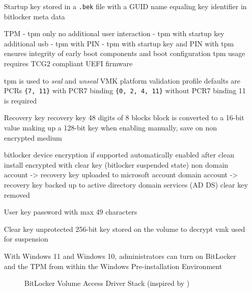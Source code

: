 \begin{itemize}
    \item[Startup key] stored in a \lstinline{.bek} file with a \ac{GUID} name equaling key identifier in bitlocker meta data
        \cite[2.6. Startup key]{bde-format-spec}
    \item[TPM]
        - tpm only
        no additional user interaction
        - tpm with startup key
        additional usb
        - tpm with PIN
        - tpm with startup key and PIN
        \cite{microsoft-bitlocker-countermeasures}
        with tpm ensures integrity of early boot components and boot configuration
        tpm usage requires \ac{TCG}2 compliant \ac{UEFI} firmware \cite[9. TPM]{windows-internals-6-part2}

        tpm is used to \emph{seal} and \emph{unseal} \ac{VMK}
        platform validation profile
        defaults are \acp{PCR} \lstinline|{7, 11}| with PCR7 binding  \lstinline|{0, 2, 4, 11}| without PCR7 binding
        11 is required
    \item[Recovery key] recovery key 48 digits of 8 blocks
        block is converted to a 16-bit value making up a 128-bit key
        \cite[2.4. Recovery key]{bde-format-spec}
        when enabling manually, save on non encrypted medium
        \cite{microsoft-bitlocker-basic-deployment}

        bitlocker device encryption if supported automatically enabled
        after clean install encrypted with clear key (bitlocker suspended state)
        non domain account -> recovery key uploaded to microsoft account
        domain account -> recovery key backed up to active directory domain services (AD DS)
        clear key removed
        \cite{microsoft-bitlocker-device-encryption}

    \item[User key] password with max 49 characters
        \cite[2.7. User key]{bde-format-spec}
    \item[Clear key] unprotected 256-bit key stored on the volume to decrypt vmk
        \cite[2.5. Clear key]{bde-format-spec}
        used for suspension


         With Windows 11 and Windows 10, administrators can turn on BitLocker and the TPM from within the Windows Pre-installation Environment \cite{microsoft-bitlocker-device-encryption}

        \begin{figure}[htb]%
            \centering
            
            \caption{BitLocker Volume Access Driver Stack (inspired by \cite[Figure 9-24]{windows-internals-6-part2})}%
            \label{fig:bitlocker-volume-access-driver-stack}%
        \end{figure}

\end{itemize}